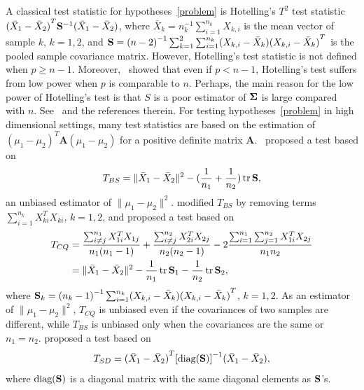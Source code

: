 \documentclass[review]{elsarticle}
\DeclareMathOperator{\mytr}{tr}
\newcommand{\BA}{\mathbf{A}}    \newcommand{\BB}{\mathbf{B}}    \newcommand{\BC}{\mathbf{C}}    \newcommand{\BD}{\mathbf{D}}    \newcommand{\BE}{\mathbf{E}}    \newcommand{\BF}{\mathbf{F}}    \newcommand{\BG}{\mathbf{G}}    \newcommand{\BH}{\mathbf{H}}    \newcommand{\BI}{\mathbf{I}}    \newcommand{\BJ}{\mathbf{J}}    \newcommand{\BK}{\mathbf{K}}    \newcommand{\BL}{\mathbf{L}}
\theoremstyle{plain}
\theoremstyle{definition}
\theoremstyle{remark}
\begin{document}
A classical test statistic for hypotheses~\eqref{problem} is Hotelling's $T^2$ test  statistic ${(\bar{X}_1-\bar{X}_2)}^T \mathbf{S}^{-1}(\bar{X}_1-\bar{X}_2)$, where $\bar{X}_k=n_k^{-1}\sum_{i=1}^{n_k}X_{k,i}$ is the mean vector of sample $k$, $k=1,2$, and
    $
    \mathbf{S}=
{(n-2)}^{-1}\sum_{k=1}^2\sum_{i=1}^{n_k} (X_{k,i}-\bar{X}_k) {(X_{k,i}-\bar{X}_k)}^T
    $
is the pooled sample covariance matrix.
However, Hotelling's test statistic is not defined when $p\geq n-1$.
Moreover,~\cite{Bai1996Efiect} showed that even if $p<n-1$, Hotelling's test suffers from low power when $p$ is comparable to $n$.
Perhaps, the main reason for the low power of Hotelling's test is that $S$ is a poor estimator of $\boldsymbol{\Sigma}$ is large compared with $n$.
See~\cite{Chen2010A} and the references therein.
For testing hypotheses~\eqref{problem} in high dimensional settings,  
many test statistics are based on the estimation of  ${(\mu_1-\mu_2)}^T \BA(\mu_1-\mu_2)$ for a positive definite matrix $\BA$.~\cite{Bai1996Efiect} proposed a test based on
\begin{equation*}
    T_{BS}=\|\bar{X}_1-\bar{X}_2\|^2-(\frac{1}{n_1}+\frac{1}{n_2})\mytr \BS,
\end{equation*}
an unbiased estimator of $\|\mu_1-\mu_2\|^2$.
\cite{Chen2010A} modified $T_{BS}$ by removing terms $\sum_{i=1}^{n_k}X_{ki}^T X_{ki}$, $k=1,2$, and proposed a test based on
\begin{equation*}
    \begin{aligned}
        T_{CQ}&=\frac{\sum_{i\neq j}^{n_1}X_{1i}^T X_{1j}}{n_1(n_1-1)}+\frac{\sum_{i\neq j}^{n_2}X_{2i}^T X_{2j}}{n_2(n_2-1)}-2\frac{\sum_{i=1}^{n_1}\sum_{j=1}^{n_2}X_{1i}^T X_{2j}}{n_1n_2}
        \\
            &=\|\bar{X}_1-\bar{X}_2\|^2-\frac{1}{n_1}\mytr \BS_1-\frac{1}{n_2}\mytr \BS_2,
    \end{aligned}
\end{equation*}
where
$\mathbf{S}_k={(n_k -1)}^{-1}\sum_{i=1}^{n_k} (X_{k,i}-\bar{X}_k) {(X_{k,i}-\bar{X}_k)}^T
$, $k=1,2$.
{\color{red}
As an estimator of $\|\mu_1-\mu_2\|^2$, $T_{CQ}$ is unbiased even if the covariances of two samples are different,
while $T_{BS}$ is unbiased only when the covariances are the same or $n_1=n_2$.
}
\cite{Srivastava2008A} proposed a test based on
\begin{equation*}
    T_{SD}={(\bar{X}_1-\bar{X}_2)}^T {[\mathrm{diag}(\mathbf{S})]}^{-1}(\bar{X}_1-\bar{X}_2),
\end{equation*}
where $\textrm{diag} (\mathbf{S})$ is a diagonal matrix with the same diagonal elements as $\mathbf{S}$'s.
\end{document}
